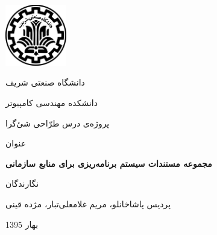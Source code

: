 
\begin{titlepage}
	\centering
	\includegraphics[width=0.20\textwidth]{img/logo}\par
	{\huge دانشگاه صنعتی شریف \par}
	\vspace{0.15cm}
	{\LARGE دانشکده مهندسی کامپیوتر \par}
	\vspace{1.5cm}
	{\LARGE پروژه‌ی درس طرّاحی شئ‌گرا \par}
	\vspace{1.5cm}
	عنوان\\
	\vspace{0.3cm}
	{\huge\bfseries مجموعه مستندات سیستم برنامه‌ریزی برای منابع سازمانی \par}
	\vspace{2cm}
	نگارندگان\\
	\vspace{0.3cm}
	{\Large پردیس پاشاخانلو، مریم غلامعلی‌تبار، مژده قینی \par}

	\vfill

	{\large بهار 1395}
\end{titlepage}